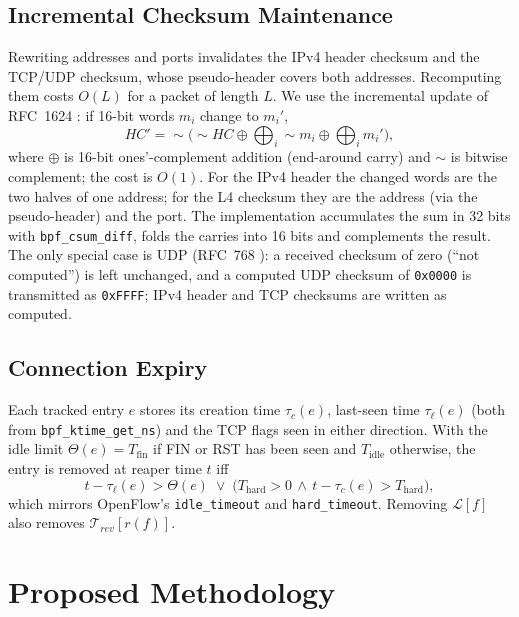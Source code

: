 \documentclass[conference]{IEEEtran}
\begin{document}
\subsection{Incremental Checksum Maintenance}
Rewriting addresses and ports invalidates the IPv4 header checksum and the
TCP/UDP checksum, whose pseudo-header covers both addresses. Recomputing them
costs $O(L)$ for a packet of length $L$. We use the incremental update of
RFC~1624 \cite{rfc1624}: if 16-bit words $m_i$ change to $m_i'$,
\begin{equation}
HC' = {\sim}\Big({\sim}HC \oplus \textstyle\bigoplus_i {\sim}m_i
\oplus \bigoplus_i m_i'\Big),
\label{eq:csum}
\end{equation}
where $\oplus$ is 16-bit ones'-complement addition (end-around carry)
\cite{rfc1071} and ${\sim}$ is bitwise complement; the cost is $O(1)$. For
the IPv4 header the changed words are the two halves of one address; for the
L4 checksum they are the address (via the pseudo-header) and the port. The
implementation accumulates the sum in 32 bits with \texttt{bpf\_csum\_diff},
folds the carries into 16 bits and complements the result. The only special
case is UDP (RFC~768 \cite{rfc768}): a received checksum of zero (``not
computed'') is left unchanged, and a computed UDP checksum of
\texttt{0x0000} is transmitted as \texttt{0xFFFF}; IPv4 header and TCP
checksums are written as computed.

\subsection{Connection Expiry}
Each tracked entry $e$ stores its creation time $\tau_c(e)$, last-seen time
$\tau_\ell(e)$ (both from \texttt{bpf\_ktime\_get\_ns}) and the TCP flags seen
in either direction. With the idle limit $\Theta(e) = T_{\mathrm{fin}}$ if FIN
or RST has been seen and $T_{\mathrm{idle}}$ otherwise, the entry is removed at
reaper time $t$ iff
\begin{equation}
t - \tau_\ell(e) > \Theta(e)
\;\lor\; \big(T_{\mathrm{hard}} > 0 \,\land\, t - \tau_c(e) > T_{\mathrm{hard}}\big),
\label{eq:expiry}
\end{equation}
which mirrors OpenFlow's \texttt{idle\_timeout} and \texttt{hard\_timeout}.
Removing $\mathcal{L}[f]$ also removes $\mathcal{T}_{rev}[r(f)]$.

\section{Proposed Methodology}
\label{sec:method}
\end{document}
